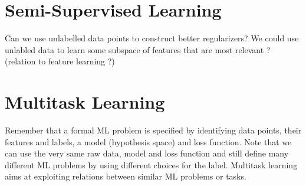 \documentclass[12pt]{report}
\begin{document}

\section{Semi-Supervised Learning} 
Can we use unlabelled data points to construct better regularizers? We could use unlabled data 
to learn some subspace of features that are most relevant ? (relation to feature learning ?)

\section{Multitask Learning} 
Remember that a formal ML problem is specified by identifying data points, their features and labels, 
a model (hypothesis space) and loss function. Note that we can use the very same raw data, model 
and loss function and still define many different ML problems by using different choices for the label. 
Multitask learning aims at exploiting relations between similar ML problems or tasks. 
\end{document}
